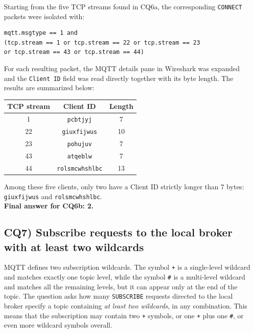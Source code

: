 \documentclass[a4paper,11pt]{article}
\begin{document}
Starting from the five TCP streams found in CQ6a, the corresponding \texttt{CONNECT}
packets were isolated with:

\begin{lstlisting}
mqtt.msgtype == 1 and
(tcp.stream == 1 or tcp.stream == 22 or tcp.stream == 23
or tcp.stream == 43 or tcp.stream == 44)
\end{lstlisting}

For each resulting packet, the MQTT details pane in Wireshark was expanded and the
\texttt{Client ID} field was read directly together with its byte length. The results
are summarized below:

\begin{center}
\begin{tabular}{ccc}
\toprule
\textbf{TCP stream} & \textbf{Client ID} & \textbf{Length} \\
\midrule
1  & \texttt{pcbtjyj}        & 7  \\
22 & \texttt{giuxfijwus}     & 10 \\
23 & \texttt{pohujuv}        & 7  \\
43 & \texttt{atqeblw}        & 7  \\
44 & \texttt{rolsmcwhshlbc}  & 13 \\
\bottomrule
\end{tabular}
\end{center}

Among these five clients, only two have a Client ID strictly longer than 7 bytes:
\texttt{giuxfijwus} and \texttt{rolsmcwhshlbc}.\\

\textbf{Final answer for CQ6b: 2.}

\subsection{CQ7) Subscribe requests to the local broker with at least two wildcards}

MQTT defines two subscription wildcards. The symbol \texttt{+} is a single-level
wildcard and matches exactly one topic level, while the symbol \texttt{\#} is a
multi-level wildcard and matches all the remaining levels, but it can appear only at
the end of the topic. The question asks how many \texttt{SUBSCRIBE} requests directed
to the local broker specify a topic containing \emph{at least two wildcards}, in any
combination. This means that the subscription may contain two \texttt{+} symbols, or
one \texttt{+} plus one \texttt{\#}, or even more wildcard symbols overall.\\
\end{document}
